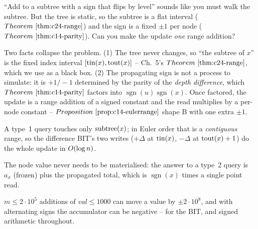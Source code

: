 \begin{attemptgate}
``Add to a subtree with a sign that flips by level'' sounds like you must
walk the subtree.  But the tree is static, so the subtree is a flat interval
(\(\thmref{c24-range}\)) and the sign is a fixed \(\pm1\) per node
(\(\thmref{c14-parity}\)).  Can you make the update \emph{one} range addition?
\end{attemptgate}

Two facts collapse the problem.  (1) The tree never changes, so ``the subtree
of \(x\)'' is the fixed index interval \([\operatorname{tin}(x),\operatorname{tout}(x)]\) -- Ch.~5's
\(\thmref{c24-range}\), which we use as a black box.  (2) The propagating sign
is not a process to simulate: it is \(+1/-1\) determined by the parity of the
\emph{depth difference}, which \(\thmref{c14-parity}\) factors into
\(\operatorname{sgn}(u)\operatorname{sgn}(x)\).  Once factored, the update is a
range addition of a signed constant and the read multiplies by a per-node
constant -- \(\propref{c14-eulerrange}\) shape B with one extra \(\pm1\).

\begin{observation}
A type~1 query touches only \(\operatorname{subtree}(x)\); in Euler order that is a
\emph{contiguous} range, so the difference BIT's two writes
(\(+\Delta\) at \(\operatorname{tin}(x)\), \(-\Delta\) at \(\operatorname{tout}(x)+1\)) do the whole
update in \(O(\log n)\).
\end{observation}
\begin{observation}
The node value never needs to be materialised: the answer to a type~2 query is
\(a_x\) (frozen) plus the propagated total, which is
\(\operatorname{sgn}(x)\) times a single point read.
\end{observation}
\begin{observation}
\(m\le2\cdot10^5\) additions of \(\mathit{val}\le1000\) can move a value by
\(\pm2\cdot10^8\), and with alternating signs the accumulator can be negative
--  for the BIT, and signed arithmetic throughout.
\end{observation}

